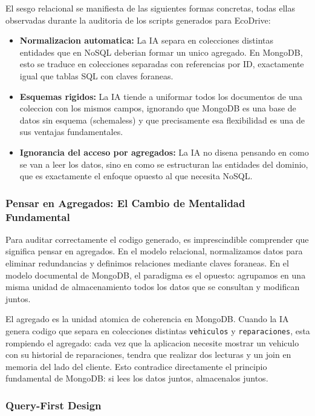El sesgo relacional se manifiesta de las siguientes formas concretas, todas ellas observadas durante la auditoria de los scripts generados para EcoDrive:

\begin{itemize}
    \item \textbf{Normalizacion automatica:} La IA separa en colecciones distintas entidades que en NoSQL deberian formar un unico agregado. En MongoDB, esto se traduce en colecciones separadas con referencias por ID, exactamente igual que tablas SQL con claves foraneas.
    \item \textbf{Esquemas rigidos:} La IA tiende a uniformar todos los documentos de una coleccion con los mismos campos, ignorando que MongoDB es una base de datos sin esquema (schemaless) y que precisamente esa flexibilidad es una de sus ventajas fundamentales.
    \item \textbf{Ignorancia del acceso por agregados:} La IA no disena pensando en como se van a leer los datos, sino en como se estructuran las entidades del dominio, que es exactamente el enfoque opuesto al que necesita NoSQL.
\end{itemize}

\subsubsection{Pensar en Agregados: El Cambio de Mentalidad Fundamental}

Para auditar correctamente el codigo generado, es imprescindible comprender que significa pensar en agregados. En el modelo relacional, normalizamos datos para eliminar redundancias y definimos relaciones mediante claves foraneas. En el modelo documental de MongoDB, el paradigma es el opuesto: agrupamos en una misma unidad de almacenamiento todos los datos que se consultan y modifican juntos.

El agregado es la unidad atomica de coherencia en MongoDB. Cuando la IA genera codigo que separa en colecciones distintas \texttt{vehiculos} y \texttt{reparaciones}, esta rompiendo el agregado: cada vez que la aplicacion necesite mostrar un vehiculo con su historial de reparaciones, tendra que realizar dos lecturas y un join en memoria del lado del cliente. Esto contradice directamente el principio fundamental de MongoDB: si lees los datos juntos, almacenalos juntos.

\subsubsection{Query-First Design}

